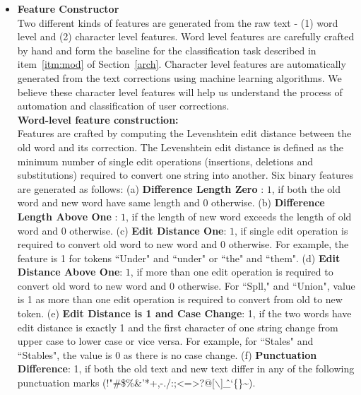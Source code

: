 \documentclass{sig-alternate}
\begin{document}
\begin{enumerate}
\begin{itemize}
\item \textbf{Feature Constructor }\\
Two different kinds of features are generated from the raw text - (1) word level and (2) character level features. Word level features are carefully crafted by hand and form the baseline for the classification task described in item~\ref{itm:mod} of Section~\ref{arch}. Character level features are automatically generated from the text corrections using machine learning algorithms. We believe these character level features will help us understand the process of automation and classification of user corrections.\\
\textbf{Word-level feature construction:}\\
Features are crafted by computing the Levenshtein edit distance between the old word and its correction. The Levenshtein edit distance \cite{Wagner_74} is defined as the minimum number of single edit operations (insertions, deletions and substitutions) required to convert one string into another. Six binary features are generated as follows: 
(a) \textbf{Difference Length Zero} : $1$, if both the old word and new word have same length and $0$ otherwise. 
(b) \textbf{Difference Length Above One} : $1$, if the length of new word exceeds the length of old word and $0$ otherwise.
(c) \textbf{Edit Distance One}:  $1$, if single edit operation is required to convert old word to new word and $0$ otherwise. For example, the feature is 1 for tokens ``Under" and ``under" or ``the" and ``them".
(d) \textbf{Edit Distance Above One}: $1$, if more than one edit operation is required to convert old word to new word and $0$ otherwise. For ``Spll," and ``Union", value is 1 as more than one edit operation is required to convert from old to new token.
(e) \textbf{Edit Distance is 1 and Case Change}: 1, if the two words have edit distance is exactly 1 and the first character of one string change from upper case to lower case or vice versa. For example, for ``Stales" and ``Stables", the value is 0 as there is no case change.
(f) \textbf{Punctuation Difference}: 1, if both the old text and new text differ in any of the following punctuation marks (!"\#\$\%\&'*+,-./:;\textless=\textgreater?@[$\backslash$]\^\_`\{\textbar\}\textasciitilde).


\end{itemize}
\end{enumerate}
\end{document}
